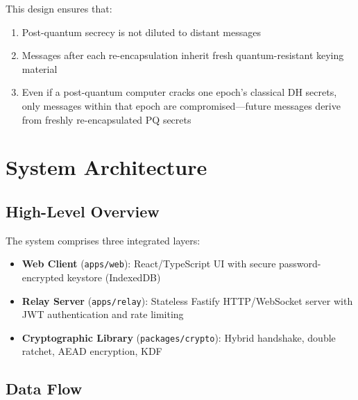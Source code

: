 \documentclass[11pt,a4paper,oneside]{article}
\begin{document}
This design ensures that:

\begin{enumerate}
\item Post-quantum secrecy is not diluted to distant messages
\item Messages after each re-encapsulation inherit fresh quantum-resistant keying material
\item Even if a post-quantum computer cracks one epoch's classical DH secrets, only messages within that epoch are compromised---future messages derive from freshly re-encapsulated PQ secrets
\end{enumerate}

\section{System Architecture}

\subsection{High-Level Overview}

The system comprises three integrated layers:

\begin{itemize}
\item \textbf{Web Client} (\texttt{apps/web}): React/TypeScript UI with secure password-encrypted keystore (IndexedDB)
\item \textbf{Relay Server} (\texttt{apps/relay}): Stateless Fastify HTTP/WebSocket server with JWT authentication and rate limiting
\item \textbf{Cryptographic Library} (\texttt{packages/crypto}): Hybrid handshake, double ratchet, AEAD encryption, KDF
\end{itemize}

\subsection{Data Flow}
\end{document}
